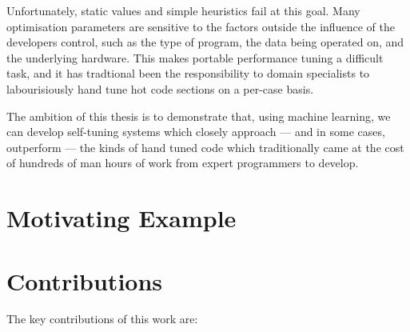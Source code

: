 Unfortunately, static values and simple heuristics fail at this
goal. Many optimisation parameters are sensitive to the factors
outside the influence of the developers control, such as the type of
program, the data being operated on, and the underlying hardware. This
makes portable performance tuning a difficult task, and it has
tradtional been the responsibility to domain specialists to
labourisiously hand tune hot code sections on a per-case basis.

The ambition of this thesis is to demonstrate that, using machine
learning, we can develop self-tuning systems which closely approach
--- and in some cases, outperform --- the kinds of hand tuned code
which traditionally came at the cost of hundreds of man hours of work
from expert programmers to develop.


\section{Motivating Example}




\section{Contributions}

The key contributions of this work are:

